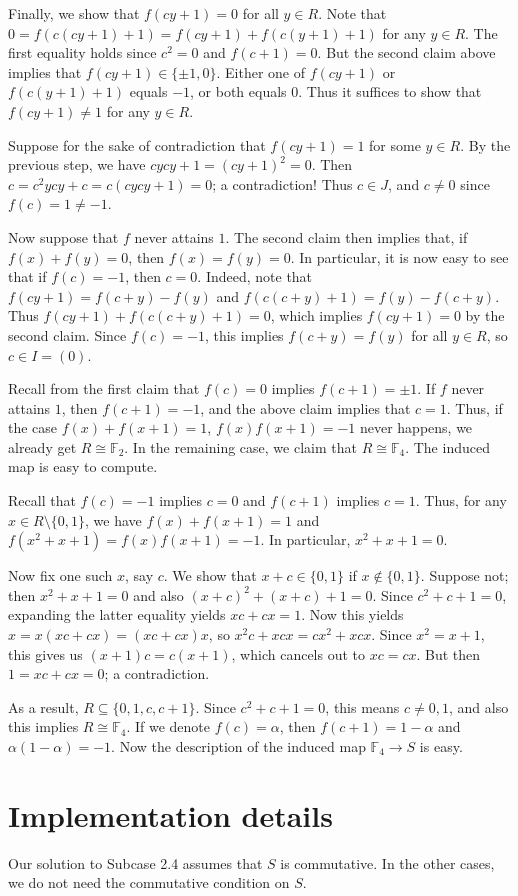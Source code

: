 \documentclass{article}
\newcommand{\F}{\mathbb{F}}
\begin{document}
\begin{itemize}
    Finally, we show that $f(cy + 1) = 0$ for all $y \in R$.
    Note that $0 = f(c(cy + 1) + 1) = f(cy + 1) + f(c(y + 1) + 1)$ for any $y \in R$.
    The first equality holds since $c^2 = 0$ and $f(c + 1) = 0$.
    But the second claim above implies that $f(cy + 1) \in \{\pm 1, 0\}$.
    Either one of $f(cy + 1)$ or $f(c(y + 1) + 1)$ equals $-1$, or both equals $0$.
    Thus it suffices to show that $f(cy + 1) \neq 1$ for any $y \in R$.
 
    Suppose for the sake of contradiction that $f(cy + 1) = 1$ for some $y \in R$.
    By the previous step, we have $cycy + 1 = (cy + 1)^2 = 0$.
    Then $c = c^2 ycy + c = c(cycy + 1) = 0$; a contradiction!
    Thus $c \in J$, and $c \neq 0$ since $f(c) = 1 \neq -1$.

    \hrulefill

    Now suppose that $f$ never attains $1$.
    The second claim then implies that, if $f(x) + f(y) = 0$, then $f(x) = f(y) = 0$.
    In particular, it is now easy to see that if $f(c) = -1$, then $c = 0$.
    Indeed, note that $f(cy + 1) = f(c + y) - f(y)$ and $f(c(c + y) + 1) = f(y) - f(c + y)$.
    Thus $f(cy + 1) + f(c(c + y) + 1) = 0$, which implies $f(cy + 1) = 0$ by the second claim.
    Since $f(c) = -1$, this implies $f(c + y) = f(y)$ for all $y \in R$, so $c \in I = (0)$.

    Recall from the first claim that $f(c) = 0$ implies $f(c + 1) = \pm 1$.
    If $f$ never attains $1$, then $f(c + 1) = -1$, and the above claim implies that $c = 1$.
    Thus, if the case $f(x) + f(x + 1) = 1$, $f(x) f(x + 1) = -1$ never happens, we already get $R \cong \F_2$.
    In the remaining case, we claim that $R \cong \F_4$.
    The induced map is easy to compute.

    Recall that $f(c) = -1$ implies $c = 0$ and $f(c + 1)$ implies $c = 1$.
    Thus, for any $x \in R \setminus \{0, 1\}$, we have $f(x) + f(x + 1) = 1$ and $f(x^2 + x + 1) = f(x) f(x + 1) = -1$.
    In particular, $x^2 + x + 1 = 0$.

    Now fix one such $x$, say $c$.
    We show that $x + c \in \{0, 1\}$ if $x \notin \{0, 1\}$.
    Suppose not; then $x^2 + x + 1 = 0$ and also $(x + c)^2 + (x + c) + 1 = 0$.
    Since $c^2 + c + 1 = 0$, expanding the latter equality yields $xc + cx = 1$.
    Now this yields $x = x(xc + cx) = (xc + cx)x$, so $x^2 c + xcx = cx^2 + xcx$.
    Since $x^2 = x + 1$, this gives us $(x + 1)c = c(x + 1)$, which cancels out to $xc = cx$.
    But then $1 = xc + cx = 0$; a contradiction.

    As a result, $R \subseteq \{0, 1, c, c + 1\}$.
    Since $c^2 + c + 1 = 0$, this means $c \neq 0, 1$, and also this implies $R \cong \F_4$.
    If we denote $f(c) = \alpha$, then $f(c + 1) = 1 - \alpha$ and $\alpha(1 - \alpha) = -1$.
    Now the description of the induced map $\F_4 \to S$ is easy.

\end{itemize}






\section*{Implementation details}

Our solution to Subcase 2.4 assumes that $S$ is commutative.
In the other cases, we do not need the commutative condition on $S$.
\end{document}
